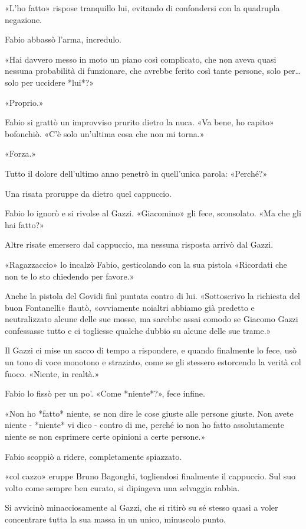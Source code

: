 «L'ho fatto» rispose tranquillo lui, evitando di confondersi con la quadrupla negazione.

Fabio abbassò l'arma, incredulo.

«Hai davvero messo in moto un piano così complicato, che non aveva quasi nessuna probabilità di funzionare, che avrebbe ferito così tante persone, solo per\ldots solo per uccidere *lui*?»

«Proprio.»

Fabio si grattò un improvviso prurito dietro la nuca. «Va bene, ho capito» bofonchiò. «C'è solo un'ultima cosa che non mi torna.»

«Forza.»

Tutto il dolore dell'ultimo anno penetrò in quell'unica parola: «Perché?»

Una risata proruppe da dietro quel cappuccio.

Fabio lo ignorò e si rivolse al Gazzi. «Giacomino» gli fece, sconsolato. «Ma che gli hai fatto?»

Altre risate emersero dal cappuccio, ma nessuna risposta arrivò dal Gazzi.

«Ragazzaccio» lo incalzò Fabio, gesticolando con la sua pistola «Ricordati che non te lo sto chiedendo per favore.»

Anche la pistola del Govidi finì puntata contro di lui. «Sottoscrivo la richiesta del buon Fontanelli» flautò, «ovviamente noialtri abbiamo già predetto e neutralizzato alcune delle sue mosse, ma sarebbe assai comodo se Giacomo Gazzi confessasse tutto e ci togliesse qualche dubbio su alcune delle sue trame.»

Il Gazzi ci mise un sacco di tempo a rispondere, e quando finalmente lo fece, usò un tono di voce monotono e straziato, come se gli stessero estorcendo la verità col fuoco. «Niente, in realtà.»

Fabio lo fissò per un po'. «Come *niente*?», fece infine.

«Non ho *fatto* niente, se non dire le cose giuste alle persone giuste. Non avete niente - *niente* vi dico - contro di me, perché io non ho fatto assolutamente niente se non esprimere certe opinioni a certe persone.»

Fabio scoppiò a ridere, completamente spiazzato.

«col cazzo» eruppe Bruno Bagonghi, togliendosi finalmente il cappuccio. Sul suo volto come sempre ben curato, si dipingeva una selvaggia rabbia.

Si avvicinò minacciosamente al Gazzi, che si ritirò su sé stesso quasi a voler concentrare tutta la sua massa in un unico, minuscolo punto.

